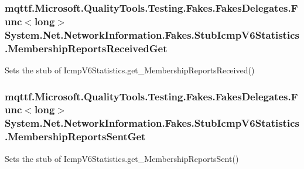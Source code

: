 \hypertarget{class_system_1_1_net_1_1_network_information_1_1_fakes_1_1_stub_icmp_v6_statistics_ab905235d41566bceb6d3ca9a22dc4536}{
\subsubsection[{Membership\-Reports\-Received\-Get}]{\setlength{\rightskip}{0pt plus 5cm}mqttf.\-Microsoft.\-Quality\-Tools.\-Testing.\-Fakes.\-Fakes\-Delegates.\-Func$<$long$>$ System.\-Net.\-Network\-Information.\-Fakes.\-Stub\-Icmp\-V6\-Statistics.\-Membership\-Reports\-Received\-Get}}\label{class_system_1_1_net_1_1_network_information_1_1_fakes_1_1_stub_icmp_v6_statistics_ab905235d41566bceb6d3ca9a22dc4536}


Sets the stub of Icmp\-V6\-Statistics.\-get\-\_\-\-Membership\-Reports\-Received()

\hypertarget{class_system_1_1_net_1_1_network_information_1_1_fakes_1_1_stub_icmp_v6_statistics_a52479d8aef10fdeb9190f543687846a4}{
\subsubsection[{Membership\-Reports\-Sent\-Get}]{\setlength{\rightskip}{0pt plus 5cm}mqttf.\-Microsoft.\-Quality\-Tools.\-Testing.\-Fakes.\-Fakes\-Delegates.\-Func$<$long$>$ System.\-Net.\-Network\-Information.\-Fakes.\-Stub\-Icmp\-V6\-Statistics.\-Membership\-Reports\-Sent\-Get}}\label{class_system_1_1_net_1_1_network_information_1_1_fakes_1_1_stub_icmp_v6_statistics_a52479d8aef10fdeb9190f543687846a4}


Sets the stub of Icmp\-V6\-Statistics.\-get\-\_\-\-Membership\-Reports\-Sent()

